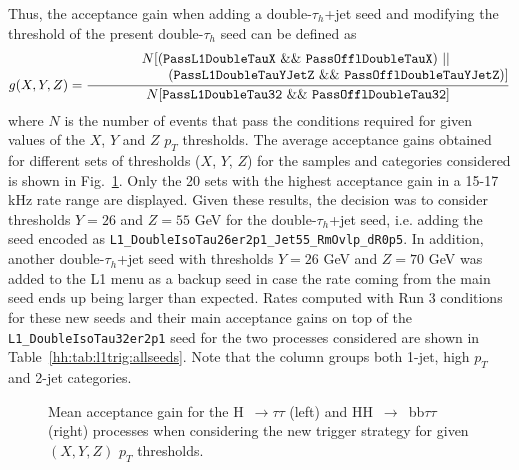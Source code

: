 \documentclass[../main.tex]{subfiles}
\begin{document}
Thus, the acceptance gain when adding a double-$\tau_h$+jet seed and modifying the threshold of the present double-$\tau_h$ seed can be defined as
\begin{equation}
g(X, Y, Z) = \frac{\begin{matrix}N[(\text{\texttt{PassL1DoubleTauX}} \,\,\&\&\,\, \text{\texttt{PassOfflDoubleTauX}}) \,\,||\,\, \\ \qquad\qquad\qquad(\text{\texttt{PassL1DoubleTauYJetZ}} \,\,\&\&\,\, \text{\texttt{PassOfflDoubleTauYJetZ}})] \end{matrix}}{N[\text{\texttt{PassL1DoubleTau32}} \,\,\&\&\,\, \text{\texttt{PassOfflDoubleTau32}}]}
\end{equation}
where $N$ is the number of events that pass the conditions required for given values of the $X$, $Y$ and $Z$ $p_T$ thresholds. The average acceptance gains obtained for different sets of thresholds ($X$, $Y$, $Z$) for the samples and categories considered is shown in Fig.~\ref{hh:fig:l1_trig_mean_acc}. Only the 20 sets with the highest acceptance gain in a 15-17 kHz rate range are displayed. Given these results, the decision was to consider thresholds $Y=26$ and $Z=55$ GeV for the double-$\tau_h$+jet seed, i.e. adding the seed encoded as \texttt{L1\_DoubleIsoTau26er2p1\_Jet55\_RmOvlp\_dR0p5}. In addition, another double-$\tau_h$+jet seed with thresholds $Y=26$ GeV and $Z=70$ GeV was added to the L1 menu as a backup seed in case the rate coming from the main seed ends up being larger than expected. Rates computed with Run 3 conditions for these new seeds and their main acceptance gains on top of the \texttt{L1\_DoubleIsoTau32er2p1} seed for the two processes considered are shown in Table~\ref{hh:tab:l1trig:allseeds}. Note that the \htt{} column groups both 1-jet, high $p_T$ and 2-jet categories.

\begin{figure}
\caption[Mean acceptance gains]{Mean acceptance gain for the H~$\to\tau\tau$ (left) and HH~$\to$~bb$\tau\tau$ (right) processes when considering the new trigger strategy for given $(X,Y,Z)$ $p_T$ thresh\-olds.}
\label{hh:fig:l1_trig_mean_acc}
\end{figure}
\end{document}
